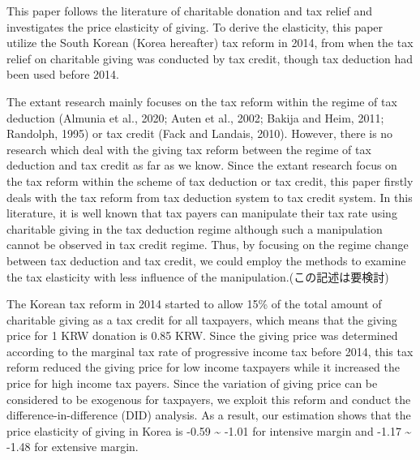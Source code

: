 \documentclass[ review  , 3p ]{elsarticle}
\begin{document}
  This paper follows the literature of charitable donation and tax relief and investigates the price elasticity of giving. To derive the elasticity, this paper utilize the South Korean (Korea hereafter) tax reform in 2014, from when the tax relief on charitable giving was conducted by tax credit, though tax deduction had been used before 2014.

  The extant research mainly focuses on the tax reform within the regime of tax deduction (Almunia et al., 2020; Auten et al., 2002; Bakija and Heim, 2011; Randolph, 1995) or tax credit (Fack and Landais, 2010). However, there is no research which deal with the giving tax reform between the regime of tax deduction and tax credit as far as we know. Since the extant research focus on the tax reform within the scheme of tax deduction or tax credit, this paper firstly deals with the tax reform from tax deduction system to tax credit system. In this literature, it is well known that tax payers can manipulate their tax rate using charitable giving in the tax deduction regime although such a manipulation cannot be observed in tax credit regime. Thus, by focusing on the regime change between tax deduction and tax credit, we could employ the methods to examine the tax elasticity with less influence of the manipulation.(この記述は要検討)

  The Korean tax reform in 2014 started to allow 15\% of the total amount of charitable giving as a tax credit for all taxpayers, which means that the giving price for 1 KRW donation is 0.85 KRW. Since the giving price was determined according to the marginal tax rate of progressive income tax before 2014, this tax reform reduced the giving price for low income taxpayers while it increased the price for high income tax payers. Since the variation of giving price can be considered to be exogenous for taxpayers, we exploit this reform and conduct the difference-in-difference (DID) analysis. As a result, our estimation shows that the price elasticity of giving in Korea is -0.59 \textasciitilde{} -1.01 for intensive margin and -1.17 \textasciitilde{} -1.48 for extensive margin.
\end{document}
